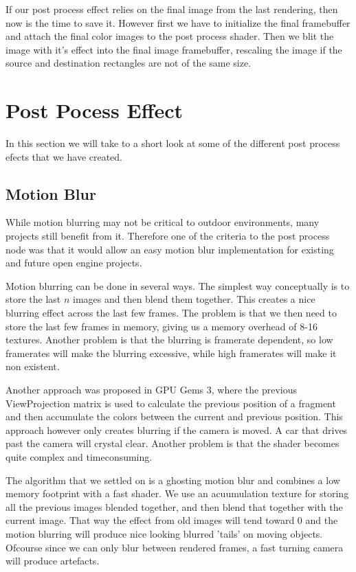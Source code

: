 
If our post process effect relies on the final image from the last
rendering, then now is the time to save it. However first we have to
initialize the final framebuffer and attach the final color images to
the post process shader. Then we blit the image with it's effect into
the final image framebuffer, rescaling the image if the source and
destination rectangles are not of the same size.


\section{Post Pocess Effect}

In this section we will take to a short look at some of the different
post process efects that we have created.

\subsection{Motion Blur}

While motion blurring may not be critical to outdoor environments,
many projects still benefit from it. Therefore one of the criteria
to the post process node was that it would allow an easy motion blur
implementation for existing and future open engine projects.

Motion blurring can be done in several ways. The simplest way
conceptually is to store the last $n$ images and then blend them
together. This creates a nice blurring effect across the last few
frames. The problem is that we then need to store the last few frames
in memory, giving us a memory overhead of 8-16 textures. Another
problem is that the blurring is framerate dependent, so low framerates
will make the blurring excessive, while high framerates will make it
non existent.

Another approach was proposed in GPU Gems 3, where the previous
ViewProjection matrix is used to calculate the previous position of a
fragment and then accumulate the colors between the current and
previous position. This approach however only creates blurring if the
camera is moved. A car that drives past the camera will crystal
clear. Another problem is that the shader becomes quite complex and
timeconsuming.

The algorithm that we settled on is a ghosting motion blur and
combines a low memory footprint with a fast shader. We use an
acuumulation texture for storing all the previous images blended
together, and then blend that together with the current image. That
way the effect from old images will tend toward 0 and the motion
blurring will produce nice looking blurred 'tails' on moving
objects. Ofcourse since we can only blur between rendered frames, a
fast turning camera will produce artefacts.

